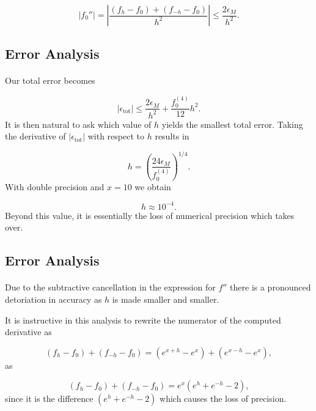\documentclass[%
oneside,                 %
final,                   %
10pt]{article}
\begin{document}
{{{{{{\[
 \left|f_0''\right|=
 \left|\frac{ (f_h -f_0) +(f_{-h}-f_0)}{h^2}\right|\le \frac{ 2 \epsilon_M}{h^2}.
\]



\subsection{Error Analysis}


\paragraph{}
Our total error becomes

\[
   \left|\epsilon_{\mbox{tot}}\right|\le  \frac{2 \epsilon_M}{h^2} +
                          \frac{f_0^{(4)}}{12}h^{2}.
    \label{eq:experror}
\]
It is then natural to ask which value of $h$ yields the smallest
total error. Taking the derivative of $\left|\epsilon_{\mbox{tot}}\right|$
with respect to $h$ results in

\[
   h= \left(\frac{ 24\epsilon_M}{f_0^{(4)}}\right)^{1/4}.
\]
With double precision and $x=10$ we obtain

\[
   h\approx 10^{-4}.
\]
Beyond this value, it is essentially the loss of numerical precision
which takes over.



\subsection{Error Analysis}


\paragraph{}
Due to the subtractive cancellation in the expression
for $f''$ there is a pronounced detoriation in accuracy as $h$ is made smaller
and smaller.

It is instructive in this analysis to rewrite the numerator of
the computed derivative as

\[
   (f_h -f_0) +(f_{-h}-f_0)=(e^{x+h}-e^{x}) + (e^{x-h}-e^{x}),
\]
as

\[
   (f_h -f_0) +(f_{-h}-f_0)=e^x(e^{h}+e^{-h}-2),
\]
since it is the difference $(e^{h}+e^{-h}-2)$ which causes
the loss of precision.



}}}}}}
\end{document}
